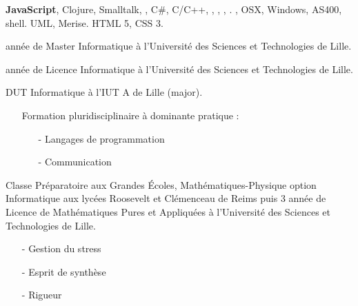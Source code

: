 \begin{rubric}{%
}
\entry*[Programmation] \textbf{JavaScript}, Clojure, Smalltalk, , C\#, C/C++, , , , .
\entry*[Système] , OSX, Windows, AS400, shell.
\entry*[Analyse] UML, Merise.
\entry*[Web] HTML 5, CSS 3.

 année de Master Informatique à l'Université des Sciences et Technologies de Lille.

 année de Licence Informatique à l'Université des Sciences et Technologies de Lille.

\entry*[2009 - 2011]
DUT Informatique à l'IUT A de Lille (major).
\begin{itemize}
 \item[] Formation pluridisciplinaire à dominante pratique :
 \item[] \begin{itemize}
        \item[- ] Langages de programmation
	\item[- ] Communication
	
       \end{itemize}
\end{itemize}

\entry*[2005 - 2009]
Classe Préparatoire aux Grandes Écoles, Mathématiques-Physique option Informatique aux lycées Roosevelt et Clémenceau de Reims puis 3 année de Licence de Mathématiques Pures et Appliquées à l'Université des Sciences et Technologies de Lille.
\begin{itemize}
 \item[- ]  Gestion du stress
  \item[- ]  Esprit de synthèse
  \item[- ]  Rigueur
\end{itemize}


\end{rubric}
